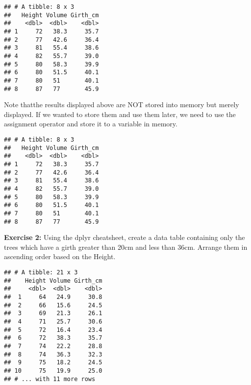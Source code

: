 \documentclass[]{article}
\newenvironment{Shaded}{\begin{snugshade}}{\end{snugshade}}
\newcommand{\CommentTok}[1]{\textcolor[rgb]{0.56,0.35,0.01}{\textit{#1}}}
\newcommand{\DataTypeTok}[1]{\textcolor[rgb]{0.13,0.29,0.53}{#1}}
\newcommand{\DecValTok}[1]{\textcolor[rgb]{0.00,0.00,0.81}{#1}}
\newcommand{\FloatTok}[1]{\textcolor[rgb]{0.00,0.00,0.81}{#1}}
\newcommand{\KeywordTok}[1]{\textcolor[rgb]{0.13,0.29,0.53}{\textbf{#1}}}
\newcommand{\NormalTok}[1]{#1}
\newcommand{\OperatorTok}[1]{\textcolor[rgb]{0.81,0.36,0.00}{\textbf{#1}}}
\newcommand{\StringTok}[1]{\textcolor[rgb]{0.31,0.60,0.02}{#1}}
\begin{document}
\begin{verbatim}
## # A tibble: 8 x 3
##   Height Volume Girth_cm
##    <dbl>  <dbl>    <dbl>
## 1     72   38.3     35.7
## 2     77   42.6     36.4
## 3     81   55.4     38.6
## 4     82   55.7     39.0
## 5     80   58.3     39.9
## 6     80   51.5     40.1
## 7     80   51       40.1
## 8     87   77       45.9
\end{verbatim}

Note thatthe results displayed above are NOT stored into memory but
merely displayed. If we wanted to store them and use them later, we need
to use the assignment operator and store it to a variable in memory.

\begin{Shaded}
\end{Shaded}

\begin{verbatim}
## # A tibble: 8 x 3
##   Height Volume Girth_cm
##    <dbl>  <dbl>    <dbl>
## 1     72   38.3     35.7
## 2     77   42.6     36.4
## 3     81   55.4     38.6
## 4     82   55.7     39.0
## 5     80   58.3     39.9
## 6     80   51.5     40.1
## 7     80   51       40.1
## 8     87   77       45.9
\end{verbatim}

\textbf{Exercise 2:} Using the dplyr cheatsheet, create a data table
containing only the trees which have a girth greater than 20cm and less
than 36cm. Arrange them in ascending order based on the Height.

\begin{verbatim}
## # A tibble: 21 x 3
##    Height Volume Girth_cm
##     <dbl>  <dbl>    <dbl>
##  1     64   24.9     30.8
##  2     66   15.6     24.5
##  3     69   21.3     26.1
##  4     71   25.7     30.6
##  5     72   16.4     23.4
##  6     72   38.3     35.7
##  7     74   22.2     28.8
##  8     74   36.3     32.3
##  9     75   18.2     24.5
## 10     75   19.9     25.0
## # ... with 11 more rows
\end{verbatim}
\end{document}
